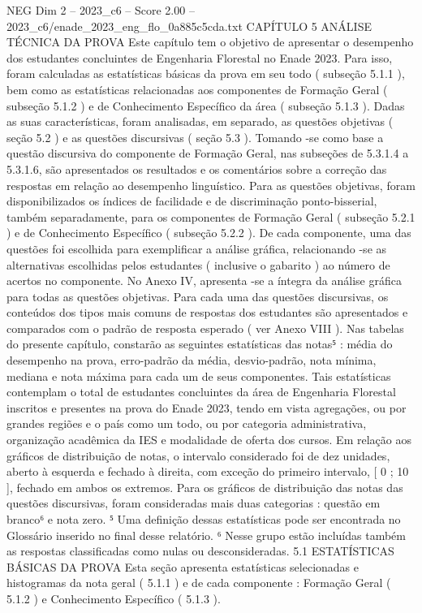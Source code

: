\begin{textsample}{NEG Dim 2 – 2023\_c6 – Score 2.00 – 2023\_c6/enade\_2023\_eng\_flo\_0a885c5cda.txt}  \label{ex:f2_neg_274}
CAPÍTULO 5 ANÁLISE TÉCNICA DA PROVA Este capítulo tem o objetivo de apresentar o desempenho dos estudantes concluintes de Engenharia Florestal no Enade 2023.
Para isso, foram calculadas as estatísticas básicas da prova em seu todo ( subseção 5.1.1 ), bem como as estatísticas relacionadas aos componentes de Formação Geral ( subseção 5.1.2 ) e de Conhecimento Específico da área ( subseção 5.1.3 ).
Dadas as suas características, foram analisadas, em separado, as questões objetivas ( seção 5.2 ) e as questões discursivas ( seção 5.3 ).
Tomando -se como base a questão discursiva do componente de Formação Geral, nas subseções de 5.3.1.4 a 5.3.1.6, são apresentados os resultados e os comentários sobre a correção das respostas em relação ao desempenho linguístico.
Para as questões objetivas, foram disponibilizados os índices de facilidade e de discriminação ponto-bisserial, também separadamente, para os componentes de Formação Geral ( subseção 5.2.1 ) e de Conhecimento Específico ( subseção 5.2.2 ).
De cada componente, uma das questões foi escolhida para exemplificar a análise gráfica, relacionando -se as alternativas escolhidas pelos estudantes ( inclusive o gabarito ) ao número de acertos no componente.
No Anexo IV, apresenta -se a íntegra da análise gráfica para todas as questões objetivas.
Para cada uma das questões discursivas, os conteúdos dos tipos mais comuns de respostas dos estudantes são apresentados e comparados com o padrão de resposta esperado ( ver Anexo VIII ).
Nas tabelas do presente capítulo, constarão as seguintes estatísticas das notas⁵ : média do desempenho na prova, erro-padrão da média, desvio-padrão, nota mínima, mediana e nota máxima para cada um de seus componentes.
Tais estatísticas contemplam o total de estudantes concluintes da área de Engenharia Florestal inscritos e presentes na prova do Enade 2023, tendo em vista agregações, ou por grandes regiões e o país como um todo, ou por categoria administrativa, organização acadêmica da IES e modalidade de oferta dos cursos.
Em relação aos gráficos de distribuição de notas, o intervalo considerado foi de dez unidades, aberto à esquerda e fechado à direita, com exceção do primeiro intervalo, [ 0 ; 10 ], fechado em ambos os extremos.
Para os gráficos de distribuição das notas das questões discursivas, foram consideradas mais duas categorias : questão em branco⁶ e nota zero. ⁵ Uma definição dessas estatísticas pode ser encontrada no Glossário inserido no final desse relatório. ⁶ Nesse grupo estão incluídas também as respostas classificadas como nulas ou desconsideradas. 5.1 ESTATÍSTICAS BÁSICAS DA PROVA Esta seção apresenta estatísticas selecionadas e histogramas da nota geral ( 5.1.1 ) e de cada componente : Formação Geral ( 5.1.2 ) e Conhecimento Específico ( 5.1.3 ).

\end{textsample}
